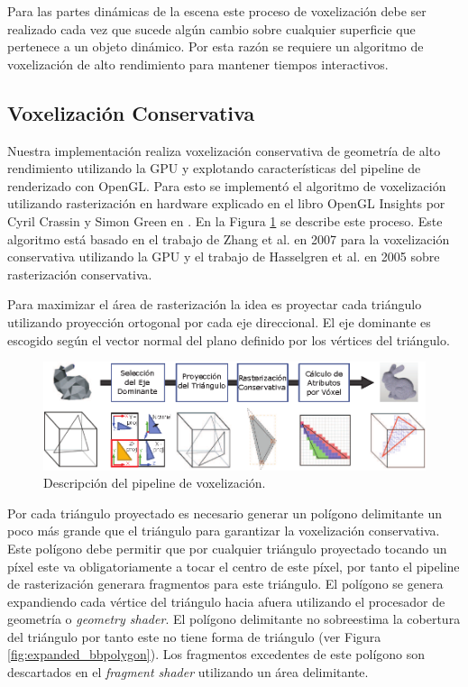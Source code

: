 Para las partes dinámicas de la escena este proceso de voxelización debe ser realizado cada vez que sucede algún cambio sobre cualquier superficie que pertenece a un objeto dinámico. Por esta razón se requiere un algoritmo de voxelización de alto rendimiento para mantener tiempos interactivos.

\subsection{Voxelización Conservativa} %
\label{sub:voxelizacion_conservativa}
Nuestra implementación realiza voxelización conservativa de geometría de alto rendimiento utilizando la \ac{GPU} y explotando características del pipeline de renderizado con OpenGL. Para esto se implementó el algoritmo de voxelización utilizando rasterización en hardware explicado en el libro OpenGL Insights por Cyril Crassin y Simon Green en  \cite{CozziRiccio12}. En la Figura \ref{fig:vox_pipeline} se describe este proceso. Este algoritmo está basado en el trabajo de Zhang et al. en 2007 \cite{zhang2007conservative} para la voxelización conservativa utilizando la \ac{GPU} y el trabajo de Hasselgren et al. en 2005 \cite{hasselgren2005conservative} sobre rasterización conservativa.

Para maximizar el área de rasterización la idea es proyectar cada triángulo utilizando proyección ortogonal por cada eje direccional. El eje dominante es escogido según el vector normal del plano definido por los vértices del triángulo.

\begin{figure}[H]
	\centering
	\captionsetup{justification=centering}
	\includegraphics[width=\linewidth]{media/voxelization_pipeline.eps}
	\caption{Descripción del pipeline de voxelización.}
	\label{fig:vox_pipeline}
\end{figure}
 
Por cada triángulo proyectado es necesario generar un polígono delimitante un poco más grande que el triángulo para garantizar la voxelización conservativa. Este polígono debe permitir que por cualquier triángulo proyectado tocando un píxel este va obligatoriamente a tocar el centro de este píxel, por tanto el pipeline de rasterización generara fragmentos para este triángulo. El polígono se genera expandiendo cada vértice del triángulo hacia afuera utilizando el procesador de geometría o \emph{geometry shader}. El polígono delimitante no sobreestima la cobertura del triángulo por tanto este no tiene forma de triángulo (ver Figura \ref{fig:expanded_bbpolygon}). Los fragmentos excedentes de este polígono son descartados en el \emph{fragment shader} utilizando un  área delimitante.

